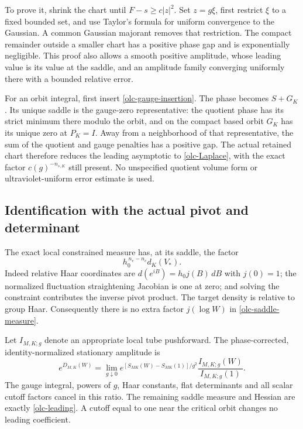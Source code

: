 \documentclass[11pt]{article}
\theoremstyle{remark}
\begin{document}
To prove it, shrink the chart until $F-s\geq c|z|^2$.
Set $z=g\xi$, first restrict $\xi$ to a fixed bounded set,
and use Taylor's formula for uniform convergence to the
Gaussian. A common Gaussian majorant removes that restriction.
The compact remainder outside a smaller chart has a positive
phase gap and is exponentially negligible. This proof also
allows a smooth positive amplitude, whose leading value is
its value at the saddle, and an amplitude family converging
uniformly there with a bounded relative error.

For an orbit integral, first insert
\eqref{olc-gauge-insertion}. The phase becomes $S+G_K$.
Its unique saddle is the gauge-zero representative: the
quotient phase has its strict minimum there modulo the orbit,
and on the compact based orbit $G_K$ has its unique zero
at $P_K=I$. Away from a neighborhood of that representative,
the sum of the quotient and gauge penalties has a positive
gap. The actual retained chart therefore reduces the leading
asymptotic to \eqref{olc-Laplace}, with the exact factor
$c(g)^{-n_{s,K}}$ still present. No unspecified quotient
volume form or ultraviolet-uniform error estimate is used.

\subsection{Identification with the actual pivot and determinant}
\label{olc-identification-section}

The exact local constrained measure has, at its saddle,
the factor
\begin{equation}
                       h_0^{\,n_e-n_c}d_K(V_*).
 \label{olc-saddle-measure}
\end{equation}
Indeed relative Haar coordinates are
$d(e^{iB})=h_0j(B)\,dB$ with $j(0)=1$; the normalized
fluctuation straightening Jacobian is one at zero; and
solving the constraint contributes the inverse pivot product.
The target density is relative to group Haar. Consequently
there is no extra factor $j(\log W)$ in
\eqref{olc-saddle-measure}.

Let $I_{M,K;g}$ denote an appropriate local tube pushforward.
The phase-corrected, identity-normalized stationary amplitude is
\begin{equation}
 e^{D_{M,K}(W)}
   =\lim_{g\downarrow0}
       e^{[S_{MK}(W)-S_{MK}(1)]/g^2}
          \frac{I_{M,K;g}(W)}{I_{M,K;g}(1)} .
 \label{olc-normalized-amplitude}
\end{equation}
The gauge integral, powers of $g$, Haar constants, flat
determinants and all scalar cutoff factors cancel in this
ratio. The remaining saddle measure and Hessian are exactly
\eqref{olc-leading}. A cutoff equal to one near the critical
orbit changes no leading coefficient.
\end{document}
